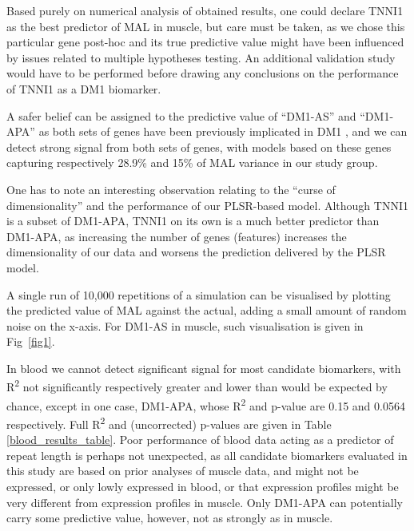 \documentclass[10pt,letterpaper]{article}
\begin{document}
Based purely on numerical analysis of obtained results, one could declare TNNI1 as the best predictor of MAL in muscle, but care must be taken, as we chose this particular gene post-hoc and its true predictive value might have been influenced by issues related to multiple hypotheses testing. An additional validation study would have to be performed before drawing any conclusions on the performance of TNNI1 as a DM1 biomarker.

A safer belief can be assigned to the predictive value of ``DM1-AS'' and ``DM1-APA'' as both sets of genes have been previously implicated in DM1 \cite{Batra2014}, and we can detect strong signal from both sets of genes, with models based on these genes capturing respectively 28.9\% and 15\% of MAL variance in our study group.

One has to note an interesting observation relating to the ``curse of dimensionality'' and the performance of our PLSR-based model. Although TNNI1 is a subset of DM1-APA, TNNI1 on its own is a much better predictor than DM1-APA, as increasing the number of genes (features) increases the dimensionality of our data and worsens the prediction delivered by the PLSR model.

A single run of 10,000 repetitions of a simulation can be visualised by plotting the predicted value of MAL against the actual, adding a small amount of random noise on the x-axis. For DM1-AS in muscle, such visualisation is given in Fig~\ref{fig1}. 

In blood we cannot detect significant signal for most candidate biomarkers, with R\textsuperscript{2} not significantly respectively greater and lower than would be expected by chance, except in one case, DM1-APA, whose R\textsuperscript{2} and p-value are 0.15 and 0.0564 respectively. Full R\textsuperscript{2} and (uncorrected) p-values are given in Table \ref{blood_results_table}. Poor performance of blood data acting as a predictor of repeat length is perhaps not unexpected, as all candidate biomarkers evaluated in this study are based on prior analyses of muscle data, and might not be expressed, or only lowly expressed in blood, or that expression profiles might be very different from expression profiles in muscle. Only DM1-APA can potentially carry some predictive value, however, not as strongly as in muscle.
\end{document}
